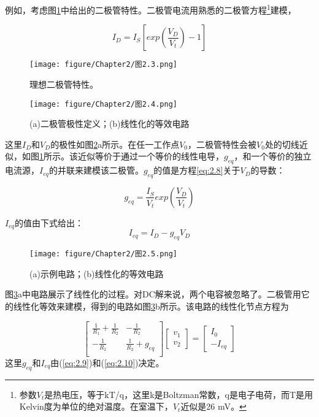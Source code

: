 例如，考虑图\ref{图2.3}中给出的二极管特性。二极管电流用熟悉的二极管方程\footnote{参数$V_t$是热电压，等于kT/q，这里k是Boltzman常数，q是电子电荷，而T是用Kelvin度为单位的绝对温度。在室温下，$V_t$近似是26 mV。}建模，

\begin{equation}
    I_D=I_S[exp(\frac{V_D}{V_t})-1]
    \label{eq:2.8}
\end{equation}

\begin{figure}[htbp]
\small
    \centering
    \texttt{[image: figure/Chapter2/图2.3.png]}
    \caption{理想二极管特性。}
    \label{图2.3}
\end{figure}

\begin{figure}[htbp]
\small
    \centering
    \texttt{[image: figure/Chapter2/图2.4.png]}
    \caption{(a)二极管极性定义；(b)线性化的等效电路}
    \label{图2.4}
\end{figure}

这里$I_D$和$V_D$的极性如图\ref{图2.4}a所示。在任一工作点$V_0$，二极管特性会被$V_0$处的切线近似，如图\ref{图2.3}所示。该近似等价于通过一个等价的线性电导，$g_{eq}$，和一个等价的独立电流源，$I_{eq}$的并联来建模该二极管。$g_{eq}$的值是方程\ref{eq:2.8}关于$V_D$的导数：

\begin{equation}
    g_{eq}=\frac{I_S}{V_t}exp(\frac{V_D}{V_t})
    \label{eq:2.9}
\end{equation}

$I_{eq}$的值由下式给出：
\begin{equation}
    I_{eq}=I_D-g_{eq}V_D
    \label{eq:2.10}
\end{equation}

\begin{figure}[htbp]
\small
    \centering
    \texttt{[image: figure/Chapter2/图2.5.png]}
    \caption{(a)示例电路；(b)线性化的等效电路}
    \label{图2.5}
\end{figure}

图\ref{图2.5}a中电路展示了线性化的过程。对DC解来说，两个电容被忽略了。二极管用它的线性化等效来建模，得到的电路如图\ref{图2.5}b所示。该电路的线性化节点方程为

\begin{equation}
\begin{bmatrix}
\frac{1}{R_1}+\frac{1}{R_2} &-\frac{1}{R_2}  \\
-\frac{1}{R_2} &\frac{1}{R_2}+g_{eq}  \\
\end{bmatrix}\begin{bmatrix}
v_1 \\
v_2
\end{bmatrix}=\begin{bmatrix}
I_0 \\
-I_{eq}\end{bmatrix}
\label{eq:2.11}
\end{equation}
这里$g_{eq}$和$I_{eq}$由(\ref{eq:2.9})和(\ref{eq:2.10})决定。

